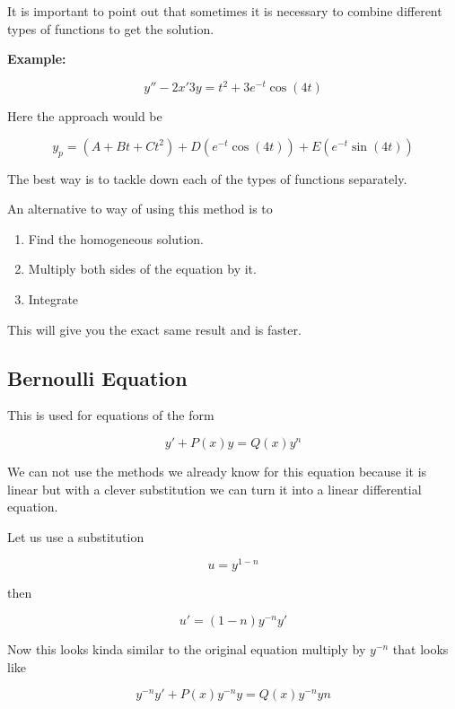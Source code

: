 It is important to point out that sometimes it is necessary to combine different types
of functions to get the solution.
\vspace{\baselineskip}

\textbf{Example:}

\[
    y'' -2x' 3y = t^2  + 3e^{-t} \cos (4t)
\]

Here the approach would be

\[
    y_p = (A + Bt + Ct^2) + D(e^{-t}\cos(4t)) + E(e^{-t}\sin(4t))
\]

The best way is to tackle down each of the types of functions separately.
\vspace{\baselineskip}

An alternative to way of using this method is to

\begin{enumerate}

    \item Find the homogeneous solution.

    \item Multiply both sides of the equation by it.

    \item Integrate

\end{enumerate}

This will give you the exact same result and is faster.

\subsection{Bernoulli Equation}

This is used for equations of the form 

\[
    y' + P(x)y = Q(x)y^n
\]

We can not use the methods we already know for this equation because it is linear but with a
clever substitution we can turn it into a linear differential equation.
\vspace{\baselineskip}

Let us use a substitution 

\[
    u = y^{1 - n}
\] 

then 

\[
    u' = (1 - n)y^{-n} y'
\] 

Now this 
looks kinda similar to the original equation multiply by \(y^{-n}\) that looks like

\[
    y^{-n}y' + P(x)y^{-n}y = Q(x)y^{-n}y{n}
\]

